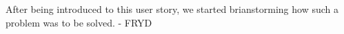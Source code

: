 After being introduced to this user story, we started brianstorming how such a problem was to be solved.
 - FRYD